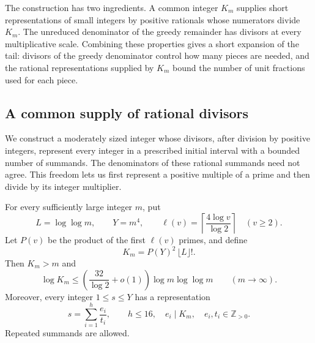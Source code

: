 The construction has two ingredients. A common integer $K_m$ supplies
short representations of small integers by positive rationals whose
numerators divide $K_m$. The unreduced denominator of the greedy
remainder has divisors at every multiplicative scale. Combining these
properties gives a short expansion of the tail: divisors of the greedy
denominator control how many pieces are needed, and the rational
representations supplied by $K_m$ bound the number of unit fractions
used for each piece.

\subsection{A common supply of rational divisors}

We construct a moderately sized integer whose divisors, after division by
positive integers, represent every integer in a prescribed initial interval
with a bounded number of summands.  The denominators of these rational
summands need not agree.  This freedom lets us first represent a positive
multiple of a prime and then divide by its integer multiplier.

\begin{lemma}\label{lem:rational-divisor-supply}
For every sufficiently large integer $m$, put
\[
 L=\log\log m,\qquad Y=m^4,\qquad
 \ell(v)=\left\lceil\frac{4\log v}{\log 2}\right\rceil
 \quad(v\geq2).
\]
Let $P(v)$ be the product of the first $\ell(v)$ primes, and define
\[
 K_m=P(Y)^2\,\lfloor L\rfloor!.
\]
Then $K_m>m$ and
\begin{equation}\label{eq:supply-size}
 \log K_m\leq
 \left(\frac{32}{\log 2}+o(1)\right)\log m\log\log m
 \qquad(m\longrightarrow\infty).
\end{equation}
Moreover, every integer $1\leq s\leq Y$ has a representation
\begin{equation}\label{eq:rational-supply}
 s=\sum_{i=1}^{h}\frac{e_i}{t_i},\qquad
 h\leq16,\quad e_i\mid K_m,\quad e_i,t_i\in\mathbb Z_{>0}.
\end{equation}
Repeated summands are allowed.
\end{lemma}

